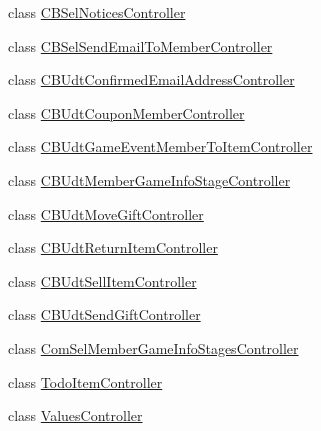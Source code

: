\begin{DoxyCompactItemize}
\item 
class \hyperlink{class_cloud_bread_1_1_controllers_1_1_c_b_sel_notices_controller}{C\+B\+Sel\+Notices\+Controller}
\item 
class \hyperlink{class_cloud_bread_1_1_controllers_1_1_c_b_sel_send_email_to_member_controller}{C\+B\+Sel\+Send\+Email\+To\+Member\+Controller}
\item 
class \hyperlink{class_cloud_bread_1_1_controllers_1_1_c_b_udt_confirmed_email_address_controller}{C\+B\+Udt\+Confirmed\+Email\+Address\+Controller}
\item 
class \hyperlink{class_cloud_bread_1_1_controllers_1_1_c_b_udt_coupon_member_controller}{C\+B\+Udt\+Coupon\+Member\+Controller}
\item 
class \hyperlink{class_cloud_bread_1_1_controllers_1_1_c_b_udt_game_event_member_to_item_controller}{C\+B\+Udt\+Game\+Event\+Member\+To\+Item\+Controller}
\item 
class \hyperlink{class_cloud_bread_1_1_controllers_1_1_c_b_udt_member_game_info_stage_controller}{C\+B\+Udt\+Member\+Game\+Info\+Stage\+Controller}
\item 
class \hyperlink{class_cloud_bread_1_1_controllers_1_1_c_b_udt_move_gift_controller}{C\+B\+Udt\+Move\+Gift\+Controller}
\item 
class \hyperlink{class_cloud_bread_1_1_controllers_1_1_c_b_udt_return_item_controller}{C\+B\+Udt\+Return\+Item\+Controller}
\item 
class \hyperlink{class_cloud_bread_1_1_controllers_1_1_c_b_udt_sell_item_controller}{C\+B\+Udt\+Sell\+Item\+Controller}
\item 
class \hyperlink{class_cloud_bread_1_1_controllers_1_1_c_b_udt_send_gift_controller}{C\+B\+Udt\+Send\+Gift\+Controller}
\item 
class \hyperlink{class_cloud_bread_1_1_controllers_1_1_com_sel_member_game_info_stages_controller}{Com\+Sel\+Member\+Game\+Info\+Stages\+Controller}
\item 
class \hyperlink{class_cloud_bread_1_1_controllers_1_1_todo_item_controller}{Todo\+Item\+Controller}
\item 
class \hyperlink{class_cloud_bread_1_1_controllers_1_1_values_controller}{Values\+Controller}
\end{DoxyCompactItemize}
